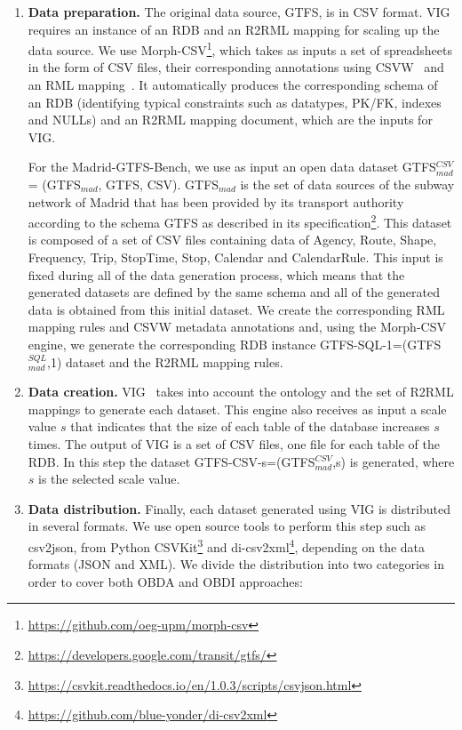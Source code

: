 \begin{enumerate}[label=\textbf{\arabic*})]
    \item \textbf{Data preparation.} The original data source, GTFS, is in CSV format. VIG requires an instance of an RDB and an R2RML mapping for scaling up the data source. We use Morph-CSV\footnote{\url{https://github.com/oeg-upm/morph-csv}}, which takes as inputs a set of spreadsheets in the form of CSV files, their corresponding annotations using CSVW~\citep{tennison2015model} and an RML mapping~\citep{dimou2014rml}. It automatically produces the corresponding schema of an RDB (identifying typical constraints such as datatypes, PK/FK, indexes and NULLs) and an R2RML mapping document, which are the inputs for VIG. 
    
    For the Madrid-GTFS-Bench, we use as input an open data dataset GTFS$_{mad}^{CSV}$ = (GTFS$_{mad}$, GTFS, CSV). GTFS$_{mad}$ is the set of data sources of the subway network of Madrid that has been provided by its transport authority according to the schema GTFS as described in its specification\footnote{\url{https://developers.google.com/transit/gtfs/}}. This dataset is composed of a set of CSV files containing data of Agency, Route, Shape, Frequency, Trip, StopTime, Stop, Calendar and CalendarRule. This input is fixed during all of the data generation process, which means that the generated datasets are defined by the same schema and all of the generated data is obtained from this initial dataset. We create the corresponding RML mapping rules and CSVW metadata annotations and, using the Morph-CSV engine, we generate the corresponding RDB instance GTFS-SQL-1=(GTFS$_{mad}^{SQL}$,1) dataset and the R2RML mapping rules.
    
    \item \textbf{Data creation.} VIG~\citep{lantivig} takes into account the ontology and the set of R2RML mappings to generate each dataset. This engine also receives as input a scale value $s$ that indicates that the size of each table of the database increases $s$ times. The output of VIG is a set of CSV files, one file for each table of the RDB. In this step the dataset GTFS-CSV-s=(GTFS$_{mad}^{CSV}$,s) is generated, where $s$ is the selected scale value.
    
    \item \textbf{Data distribution.} Finally, each dataset generated using VIG is distributed in several formats. We use open source tools to perform this step such as csv2json, from Python CSVKit\footnote{\url{https://csvkit.readthedocs.io/en/1.0.3/scripts/csvjson.html}} and di-csv2xml\footnote{\url{https://github.com/blue-yonder/di-csv2xml}}, depending on the data formats %
    (JSON and XML). We divide the distribution into two categories in order to cover both OBDA and OBDI approaches: 
    

\end{enumerate}
